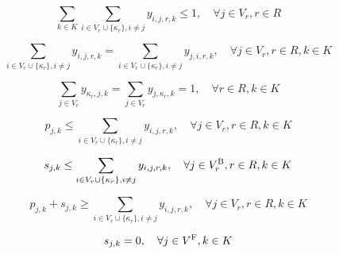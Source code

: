 \begin{linenomath}
    \begin{equation}
        \sum_{k \in K}\sum_{i \in V_r \cup \{\kappa_r\}, i \neq j} y_{i,j,r,k} \leq 1, \quad \forall j \in V_r, r \in R \label{eq:bike_visit}
    \end{equation}
\end{linenomath}

\begin{linenomath}
    \begin{equation}
        \sum_{i \in V_r \cup \{\kappa_r\}, i \neq j} y_{i,j,r,k} = \sum_{i \in V_r \cup \{\kappa_r\}, i \neq j} y_{j,i,r,k}, \quad \forall j \in V_r, r \in R, k \in K \label{eq:laborer_flow}
    \end{equation}
\end{linenomath}

\begin{linenomath}
    \begin{equation}
        \sum_{j \in V_r} y_{\kappa_r,j,k} = \sum_{j \in V_r} y_{j,\kappa_r,k} = 1, \quad \forall r \in R, k \in K \label{eq:laborer_tour}
    \end{equation}
\end{linenomath}

\begin{linenomath}
    \begin{equation}
        p_{j,k} \leq \sum_{i \in V_r \cup \{\kappa_r\}, i \neq j} y_{i,j,r,k}, \quad \forall j \in V_r, r \in R, k \in K \label{eq:pickup_visit}
    \end{equation}
\end{linenomath}

\begin{linenomath}
    \begin{equation}
        s_{j,k} \leq \sum_{i \in V_r \cup \{\kappa_r\}, i \neq j} y_{i,j,r,k}, \quad \forall j \in V_r^{\text{B}}, r \in R, k \in K \label{eq:repair_visit}
    \end{equation}
\end{linenomath}

\begin{linenomath}
    \begin{equation}
        p_{j,k} + s_{j,k} \geq \sum_{i \in V_r \cup \{\kappa_r\}, i \neq j} y_{i,j,r,k}, \quad \forall j \in V_r, r \in R, k \in K \label{eq:visit_action}
    \end{equation}
\end{linenomath}

\begin{linenomath}
    \begin{equation}
        s_{j,k} = 0, \quad \forall j \in V^{\text{F}}, k \in K \label{eq:functional_no_repair}
    \end{equation}
\end{linenomath}

